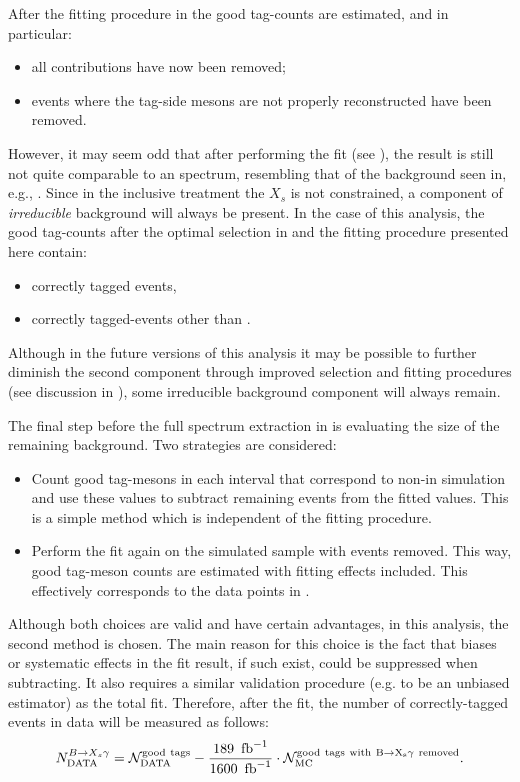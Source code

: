 After the fitting procedure in  the good tag-\B counts are estimated, and in particular:
\begin{itemize}
    \item all \epem\ra\qqbar contributions have now been removed;
    \item events where the tag-side \B mesons are not properly reconstructed have been removed.
\end{itemize}

However, it may seem odd that after performing the \Mbc fit (see ), the result is still not quite comparable to an \EB spectrum,
resembling that of the background seen in, e.g., .
Since in the inclusive treatment the $X_s$ is not constrained, a component of \textit{irreducible} background will always be present.
In the case of this analysis, the good tag-\B counts after the optimal selection in  and the fitting procedure presented here contain:
\begin{itemize}
    \item correctly tagged \BtoXsgamma events,
    \item correctly tagged-\BB events other than \BtoXsgamma.
\end{itemize}
Although in the future versions of this analysis it may be possible to further diminish the second component through improved selection and fitting procedures (see discussion in ), 
some irreducible background component will always remain.

The final step before the full \BtoXsgamma spectrum extraction in \MC is evaluating the size of the remaining \BB background.
Two strategies are considered:
\begin{itemize}
    \item Count good tag-\B mesons in each \EB interval that correspond to non-\BtoXsgamma in simulation and use these values to subtract remaining \BB events from the fitted values.
    This is a simple method which is independent of the fitting procedure.
    \item Perform the fit again on the simulated sample with \BtoXsgamma events removed.
    This way, good tag-\B meson counts are estimated with fitting effects included.
    This effectively corresponds to the data points in .
\end{itemize}
Although both choices are valid and have certain advantages, in this analysis, the second method is chosen.
The main reason for this choice is the fact that biases or systematic effects in the fit result, if such exist, could be suppressed when subtracting.
It also requires a similar validation procedure (e.g. to be an unbiased estimator) as the total fit.
Therefore, after the \Mbc fit, the number of correctly-tagged \BtoXsgamma events in data will be measured as follows:
\begin{equation}\label{eq:background_subtraction}
    N_{\mathrm{DATA}}^{\BtoXsgamma} = \mathcal{N}_{\mathrm{DATA}}^{\mathrm{good~tags}}  - \frac{189~\invfb}{1600~\invfb}\cdot \mathcal{N}_{\mathrm{MC}}^{\mathrm{good~tags~with~\BtoXsgamma~removed}}.
\end{equation}